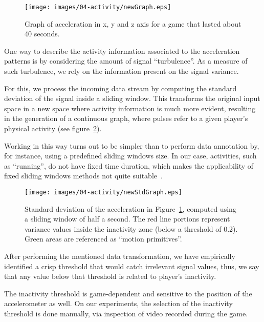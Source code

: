\begin{figure}[h!]
      \centering
      \texttt{[image: images/04-activity/newGraph.eps]}
      \caption{Graph of acceleration in x, y and z axis for a game that lasted about 40 seconds.}
      \label{acc_graph}
\end{figure}

One way to describe the activity information associated to the acceleration patterns is by considering the amount of signal ``turbulence''. As a measure of such turbulence, we rely on the information present on the signal variance. 

For this, we process the incoming data stream by computing the standard deviation of the signal inside a sliding window. This transforms the original input space in a new space where activity information is much more evident, resulting in the generation of a continuous graph, where pulses refer to a given player's physical activity (see figure~\ref{fig:std_graph}). %

Working in this way turns out to be simpler than to perform data annotation by, for instance, using a predefined sliding windows size. In our case, activities, such as ``running'', do not have fixed time duration, which makes the applicability of fixed sliding windows methods not quite suitable~\cite{noor_adaptive_2016}.

\begin{figure}[H]
      \centering
      \texttt{[image: images/04-activity/newStdGraph.eps]}
      \caption{Standard deviation of the acceleration in Figure~\ref{acc_graph}, computed using a sliding window of half a second. The red line portions represent variance values inside the inactivity zone (below a threshold of 0.2). Green areas are referenced as ``motion primitives''.}\label{fig:std_graph}
\end{figure}

After performing the mentioned data transformation, we have empirically identified a crisp threshold that would catch irrelevant signal values, thus, we say that any value below that threshold is related to player's inactivity.

The inactivity threshold is game-dependent and sensitive to the position of the accelerometer as well. On our experiments, the selection of the inactivity threshold is done manually, via inspection of video recorded during the game.

